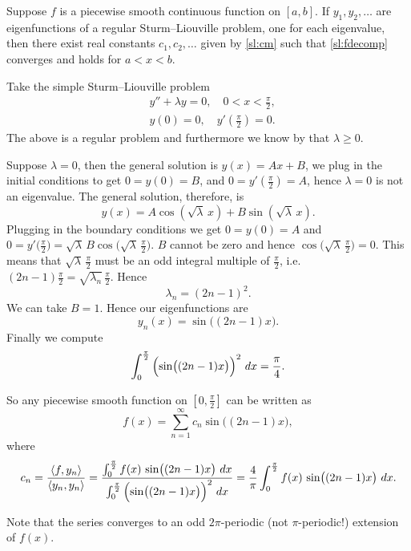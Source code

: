 \begin{theorem}
Suppose $f$ is a piecewise smooth continuous function on $[a,b]$.  If $y_1,
y_2, \ldots$ are eigenfunctions of a regular Sturm--Liouville problem,
one for each eigenvalue,
then there exist real constants $c_1, c_2, \ldots$ given by \eqref{sl:cm}
such that
\eqref{sl:fdecomp} converges and holds for $a < x < b$.
\end{theorem}

\begin{example}
Take the simple Sturm--Liouville problem
\begin{align*}
& y'' + \lambda y = 0, \quad 0 < x < \frac{\pi}{2} , \\
& y(0) =0, \quad y'\left(\frac{\pi}{2}\right) = 0 .
\end{align*}
The above is a regular problem and furthermore we know by
that $\lambda \geq 0$.

Suppose $\lambda = 0$, then the general solution is $y(x) = Ax + B$,
we plug in the
initial conditions to get $0=y(0) = B$, and $0 = y'(\frac{\pi}{2}) = A$, hence
$\lambda = 0$ is not an eigenvalue.
The general solution, therefore, is
\begin{equation*}
y(x) = A \cos ( \sqrt{\lambda} \, x ) + B \sin ( \sqrt{\lambda} \, x) .
\end{equation*}
Plugging in the boundary conditions we get
$0 = y(0) = A$ and $0 = y'\bigl(\frac{\pi}{2}\bigr)
= \sqrt{\lambda} \, B \cos \bigl(\sqrt{\lambda} \, \frac{\pi}{2}\bigr)$.
$B$ cannot be zero and hence $\cos \bigl( \sqrt{\lambda} \,
\frac{\pi}{2}\bigr) = 0$.
This means that
$\sqrt{\lambda} \,\frac{\pi}{2}$ must be an odd integral multiple of
$\frac{\pi}{2}$,
i.e.\ $(2n-1)\frac{\pi}{2} = \sqrt{\lambda_n} \,\frac{\pi}{2}$.
Hence
\begin{equation*}
\lambda_n = {(2n-1)}^2 .
\end{equation*}
We can take $B = 1$.  Hence our eigenfunctions are
\begin{equation*}
y_n(x) = \sin \bigl( (2n-1)x \bigr) .
\end{equation*}
Finally we compute
\begin{equation*}
\int_0^{\frac{\pi}{2}} {\Bigl( \sin \bigl( (2n-1)x \bigr) \Bigr)}^2 ~ dx
= \frac{\pi}{4} .
\end{equation*}

So any piecewise smooth function on $[0,\frac{\pi}{2}]$ can be written as
\begin{equation*}
f(x) = \sum_{n=1}^\infty c_n \sin \bigl( (2n-1)x \bigr) ,
\end{equation*}
where
\begin{equation*}
c_n = \frac{\langle f , y_n \rangle}{\langle y_n , y_n \rangle}
= \frac{\int_0^{\frac{\pi}{2}} f(x) \, \sin \bigl( (2n-1)x \bigr) ~ dx
}{\int_0^{\frac{\pi}{2}} {\Bigl(\sin \bigl((2n-1)x\bigr)\Bigr)}^2 ~ dx}
= \frac{4}{\pi} \int_0^{\frac{\pi}{2}} f(x) \,\sin \bigl( (2n-1)x \bigr) ~ dx .
\end{equation*}

Note that the series converges to an odd $2\pi$-periodic (not
$\pi$-periodic!) extension of $f(x)$.
\end{example}

